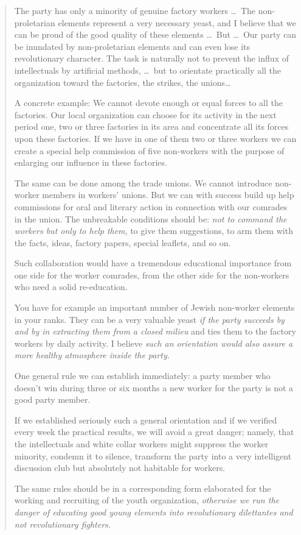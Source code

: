\begin{quote}
  The party has only a minority of genuine factory workers \dots\ The non-proletarian elements represent a very necessary yeast, and I believe that we can be proud of the good quality of these elements \dots\ But \dots\ Our party can be inundated by non-proletarian elements and can even lose its revolutionary character. The task is naturally not to prevent the influx of intellectuals by artificial methods, \dots\ but to orientate practically all the organization toward the factories, the strikes, the unions\dots\
  
  A concrete example: We cannot devote enough or equal forces to all the factories. Our local organization can choose for its activity in the next period one, two or three factories in its area and concentrate all its forces upon these factories. If we have in one of them two or three workers we can create a special help commission of five non-workers with the purpose of enlarging our influence in these factories.
  
  The same can be done among the trade unions. We cannot introduce non-worker members in workers’ unions. But we can with success build up help commissions for oral and literary action in connection with our comrades in the union. The unbreakable conditions should be: \emph{not to command the workers but only to help them}, to give them suggestions, to arm them with the facts, ideas, factory papers, special leaflets, and so on.
  
  Such collaboration would have a tremendous educational importance from one side for the worker comrades, from the other side for the non-workers who need a solid re-education.
  
  You have for example an important number of Jewish non-worker elements in your ranks. They can be a very valuable yeast \emph{if the party succeeds by and by in extracting them from a closed milieu} and ties them to the factory workers by daily activity. I believe \emph{such an orientation would also assure a more healthy atmosphere inside the party.}
  
  One general rule we can establish immediately: a party member who doesn’t win during three or six months a new worker for the party is not a good party member.
  
  If we established seriously such a general orientation and if we verified every week the practical results, we will avoid a great danger; namely, that the intellectuals and white collar workers might suppress the worker minority, condemn it to silence, transform the party into a very intelligent discussion club but absolutely not habitable for workers.
  \nowidow
  
  The same rules should be in a corresponding form elaborated for the working and recruiting of the youth organization, \emph{otherwise we run the danger of educating good young elements into revolutionary dilettantes and not revolutionary fighters.}
\end{quote}

